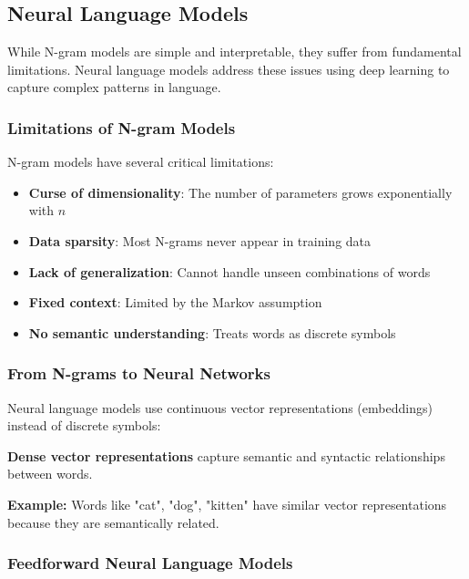 \documentclass[11pt,a4paper]{article}
\theoremstyle{definition}
\theoremstyle{plain}
\theoremstyle{remark}
\begin{document}
\subsection{Neural Language Models}

While N-gram models are simple and interpretable, they suffer from fundamental limitations. Neural language models address these issues using deep learning to capture complex patterns in language.

\subsubsection{Limitations of N-gram Models}

N-gram models have several critical limitations:

\begin{itemize}
    \item \textbf{Curse of dimensionality}: The number of parameters grows exponentially with $n$
    \item \textbf{Data sparsity}: Most N-grams never appear in training data
    \item \textbf{Lack of generalization}: Cannot handle unseen combinations of words
    \item \textbf{Fixed context}: Limited by the Markov assumption
    \item \textbf{No semantic understanding}: Treats words as discrete symbols
\end{itemize}

\subsubsection{From N-grams to Neural Networks}

Neural language models use continuous vector representations (embeddings) instead of discrete symbols:

\begin{tcolorbox}[colback=blue!5!white,colframe=blue!75!black,title=\textbf{Key Innovation: Word Embeddings}]
\textbf{Dense vector representations} capture semantic and syntactic relationships between words.

\textbf{Example:} Words like "cat", "dog", "kitten" have similar vector representations because they are semantically related.
\end{tcolorbox}

\subsubsection{Feedforward Neural Language Models}
\end{document}
